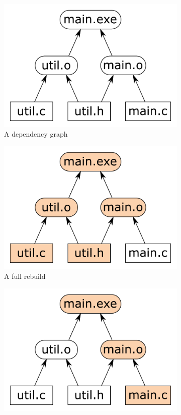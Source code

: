 \begin{figure}[h]
\begin{subfigure}[b]{0.32\linewidth}
\centerline{\includegraphics[scale=0.28]{fig/make-example.pdf}}
\caption{A dependency graph}
\end{subfigure}
\begin{subfigure}[b]{0.32\linewidth}
\centerline{\includegraphics[scale=0.28]{fig/make-example-full.pdf}}
\caption{A full rebuild}
\end{subfigure}
\begin{subfigure}[b]{0.32\linewidth}
\centerline{\includegraphics[scale=0.28]{fig/make-example-partial.pdf}}

\end{subfigure}
\end{figure}
